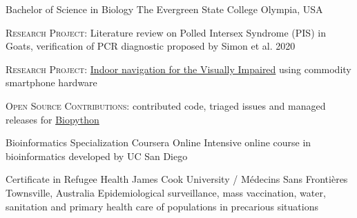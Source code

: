

\begin{cventries}

  \cventry
    {Bachelor of Science in Biology} %
    {The Evergreen State College} %
    {Olympia, USA} %
    {} %
    {
      \begin{cvitems} %
        \item \textsc{Research Project:} Literature review on Polled Intersex Syndrome (PIS) in Goats, verification of PCR diagnostic proposed by Simon et al. 2020
        \item \textsc{Research Project:} \href{https://referencepointnavigation.com/}{Indoor navigation for the Visually Impaired} using commodity smartphone hardware
        \item \textsc{Open Source Contributions:} contributed code, triaged issues and managed releases for \href{https://www.open-bio.org/2020/05/25/biopython-1-77-released/}{Biopython}
      \end{cvitems}
    }

  \cventry
    {Bioinformatics Specialization} %
    {Coursera} %
    {Online} %
    {} %
    {Intensive online course in bioinformatics developed by UC San Diego}

  \cventry
    {Certificate in Refugee Health} %
    {James Cook University / Médecins Sans Frontières} %
    {Townsville, Australia} %
    {} %
    {Epidemiological surveillance, mass vaccination, water, sanitation and primary health care of populations in precarious situations} %
\end{cventries}
